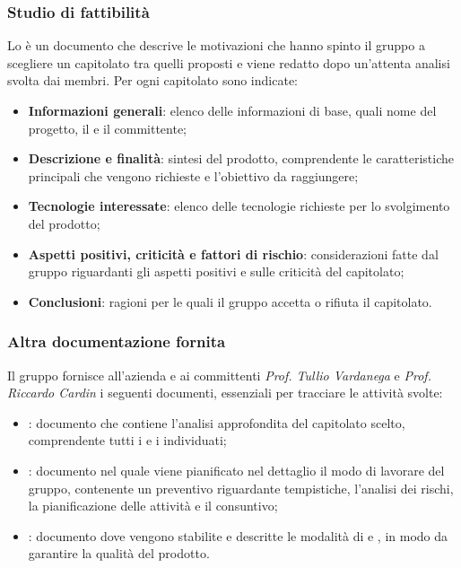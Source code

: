 \subsubsection{Studio di fattibilità}
Lo \SdF{} è un documento che descrive le motivazioni che hanno spinto il gruppo \gruppo{} a scegliere un capitolato tra quelli proposti e viene redatto dopo un'attenta analisi svolta dai membri.
Per ogni capitolato sono indicate:
\begin{itemize}
	\item \textbf{Informazioni generali}: elenco delle informazioni di base, quali nome del progetto, il  e il committente;
	\item \textbf{Descrizione e finalità}: sintesi del prodotto, comprendente le caratteristiche principali che vengono richieste e l'obiettivo da raggiungere;
	\item \textbf{Tecnologie interessate}: elenco delle tecnologie richieste per lo svolgimento del prodotto;
	\item \textbf{Aspetti positivi, criticità e fattori di rischio}: considerazioni fatte dal gruppo riguardanti gli aspetti positivi e sulle criticità del capitolato;
	\item \textbf{Conclusioni}: ragioni per le quali il gruppo accetta o rifiuta il capitolato.
\end{itemize}

\subsubsection{Altra documentazione fornita}

Il gruppo fornisce all'azienda \proponente{} e ai committenti \textit{Prof. Tullio Vardanega} e \textit{Prof. Riccardo Cardin} i seguenti documenti, essenziali per tracciare le attività svolte:
\begin{itemize}
	\item \textbf{\AdR{}}: documento che contiene l'analisi approfondita del capitolato scelto, comprendente tutti i  e i  individuati;
	\item \textbf{\PdP{}}: documento nel quale viene pianificato nel dettaglio il modo di lavorare del gruppo, contenente un preventivo riguardante tempistiche, l'analisi dei rischi, la pianificazione delle attività e il consuntivo;
	\item \textbf{\PdQ{}}: documento dove vengono stabilite e descritte le modalità di  e , in modo da garantire la qualità del prodotto.
\end{itemize}

